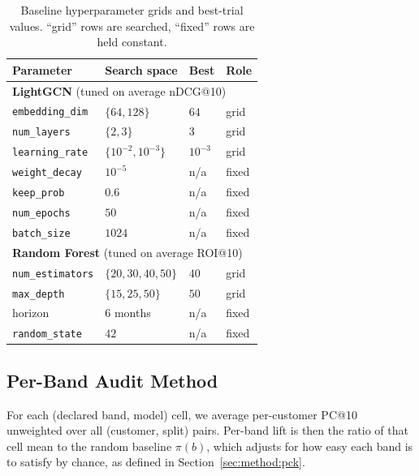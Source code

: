 \begin{table}[!t]
\centering
\small
\begin{tabular}{llll}
\toprule
Parameter & Search space & Best & Role \\
\midrule
\multicolumn{4}{l}{\textbf{LightGCN} (tuned on average nDCG@10)} \\
\texttt{embedding\_dim}    & $\{64, 128\}$          & $64$      & grid \\
\texttt{num\_layers}       & $\{2, 3\}$             & $3$       & grid \\
\texttt{learning\_rate}    & $\{10^{-2}, 10^{-3}\}$ & $10^{-3}$ & grid \\
\texttt{weight\_decay}     & $10^{-5}$              & n/a       & fixed \\
\texttt{keep\_prob}        & $0.6$                  & n/a       & fixed \\
\texttt{num\_epochs}       & $50$                   & n/a       & fixed \\
\texttt{batch\_size}       & $1024$                 & n/a       & fixed \\
\midrule
\multicolumn{4}{l}{\textbf{Random Forest} (tuned on average ROI@10)} \\
\texttt{num\_estimators}   & $\{20, 30, 40, 50\}$   & $40$      & grid \\
\texttt{max\_depth}        & $\{15, 25, 50\}$        & $50$      & grid \\
horizon                    & 6 months               & n/a       & fixed \\
\texttt{random\_state}     & $42$                   & n/a       & fixed \\
\bottomrule
\end{tabular}
\caption{Baseline hyperparameter grids and best-trial values. ``grid'' rows are searched, ``fixed'' rows are held constant.}
\label{tab:baseline-grids}
\end{table}

\subsection{Per-Band Audit Method}
\label{sec:rq2:method}

For each (declared band, model) cell, we average per-customer PC@10 unweighted over all (customer, split) pairs. Per-band lift is then the ratio of that cell mean to the random baseline $\pi(b)$, which adjusts for how easy each band is to satisfy by chance, as defined in Section~\ref{sec:method:pck}.

